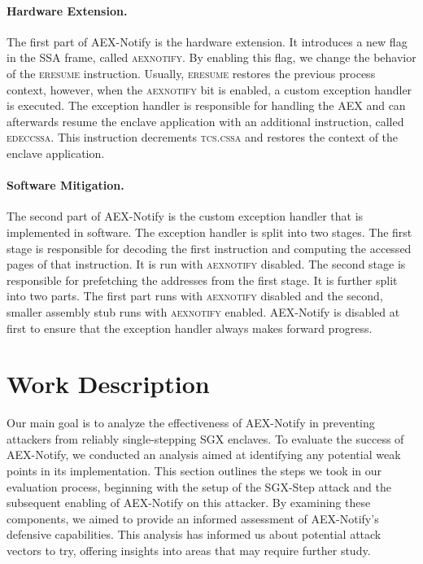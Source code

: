 \documentclass{llncs}
\begin{document}
\paragraph{Hardware Extension.}
The first part of AEX-Notify is the hardware extension.
It introduces a new flag in the SSA frame, called \textsc{aexnotify}.
By enabling this flag, we change the behavior of the \textsc{eresume} instruction.
Usually, \textsc{eresume} restores the previous process context,
however, when the \textsc{aexnotify} bit is enabled,
a custom exception handler is executed.
The exception handler is responsible for handling the AEX and
can afterwards resume the enclave application with an additional instruction, called \textsc{edeccssa}.
This instruction decrements \textsc{tcs.cssa} and restores the context of the enclave application.

\paragraph{Software Mitigation.}
The second part of AEX-Notify is the custom exception handler that is implemented in software.
The exception handler is split into two stages.
The first stage is responsible for decoding the first instruction and
computing the accessed pages of that instruction.
It is run with \textsc{aexnotify} disabled.
The second stage is responsible for prefetching the addresses from the first stage.
It is further split into two parts.
The first part runs with \textsc{aexnotify} disabled
and the second, smaller assembly stub runs with \textsc{aexnotify} enabled.
AEX-Notify is disabled at first to ensure that the exception handler always makes forward progress.

\section{Work Description}

Our main goal is to analyze the effectiveness of AEX-Notify
in preventing attackers from reliably single-stepping SGX enclaves.
To evaluate the success of AEX-Notify,
we conducted an analysis aimed at identifying any potential weak points in its implementation.
This section outlines the steps we took in our evaluation process,
beginning with the setup of the SGX-Step attack and
the subsequent enabling of AEX-Notify on this attacker.
By examining these components,
we aimed to provide an informed assessment of AEX-Notify’s defensive capabilities.
This analysis has informed us about potential attack vectors to try,
offering insights into areas that may require further study.
\end{document}
